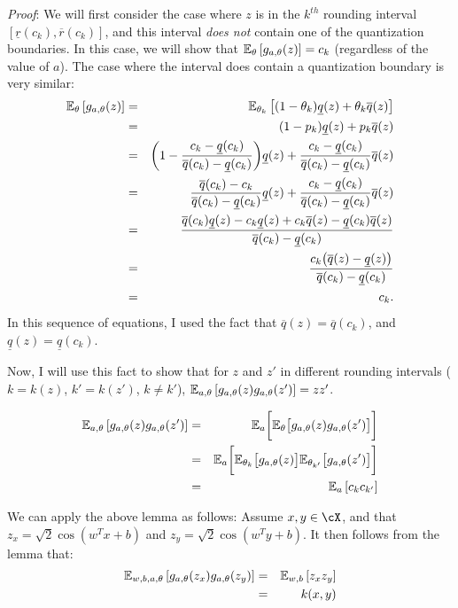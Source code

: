 \documentclass[12pt]{article}
\newcommand{\sq}{\sqrt{2}}
\newcommand{\eps}{\epsilon}
\newcommand{\ulq}{\underline{q}}
\newcommand{\olq}{\overline{q}}
\newcommand{\ulr}{\underline{r}}
\newcommand{\olr}{\overline{r}}
\newcommand{\Exp}{\ProbOpr{E}}
\begin{document}
\textit{Proof}: We will first consider the case where $z$ is in the $k^{th}$ rounding interval $[\ulr(c_k),\olr(c_k)]$, and this interval \textit{does not} contain one of the quantization boundaries.  In this case, we will show that $\expect{\theta}{g_{a,\theta}(z)} = c_k$ (regardless of the value of $a$).  The case where the interval does contain a quantization boundary is very similar:
\begin{eqnarray*}
	\expect{\theta}{g_{a,\theta}(z)} &=&  \expect{\theta_k}{(1-\theta_k)\ulq(z) + \theta_k\olq(z)} \\
	&=& (1-p_k)\ulq(z) + p_k\olq(z) \\
	&=& \bigg(1-\frac{c_k-\ulq(c_k)}{\olq(c_k)-\ulq(c_k)}\bigg)\ulq(z) + \frac{c_k-\ulq(c_k)}{\olq(c_k)-\ulq(c_k)}\olq(z) \\
	&=& \frac{\olq(c_k)-c_k}{\olq(c_k)-\ulq(c_k)}\ulq(z) + \frac{c_k-\ulq(c_k)}{\olq(c_k)-\ulq(c_k)}\olq(z) \\
	&=& \frac{\olq(c_k)\ulq(z) - c_k\ulq(z) +c_k\olq(z) -\ulq(c_k)\olq(z)}{\olq(c_k)-\ulq(c_k)}\\
	&=& \frac{c_k\big(\olq(z)-\ulq(z)\big)}{\olq(c_k)-\ulq(c_k)}\\
	&=& c_k.
\end{eqnarray*}
In this sequence of equations, I used the fact that $\olq(z) = \olq(c_k)$, and $\ulq(z) = \ulq(c_k)$.

Now, I will use this fact to show that for $z$ and $z'$ in different rounding intervals ($k=k(z)$, $k'=k(z')$, $k\neq k'$), $\expect{a,\theta}{g_{a,\theta}(z)g_{a,\theta}(z')} = zz'$.

\begin{eqnarray*}
\expect{a,\theta}{g_{a,\theta}(z)g_{a,\theta}(z')} &=& 
\Exp_a \bigg[\Exp_{\theta}\big[g_{a,\theta}(z)g_{a,\theta}(z')\big] \bigg]   \\
&=& \Exp_a \bigg[\Exp_{\theta_k}\big[g_{a,\theta}(z)\big]  \Exp_{\theta_{k'}}\big[g_{a,\theta}(z')\big] \bigg]   \\
&=& \expect{a}{c_k c_{k'}}   \\
\end{eqnarray*}

We can apply the above lemma as follows: Assume $x,y \in \cX$, and that $z_x = \sq \cos(w^Tx+b)$ and $z_y = \sq \cos(w^Ty+b)$.  It then follows from the lemma that:
\begin{eqnarray*}
\expect{w,b,a,\theta}{g_{a,\theta}(z_x)g_{a,\theta}(z_y)} &=& \expect{w,b}{z_x z_y} \\
&=& k(x,y)
\end{eqnarray*}
\end{document}
